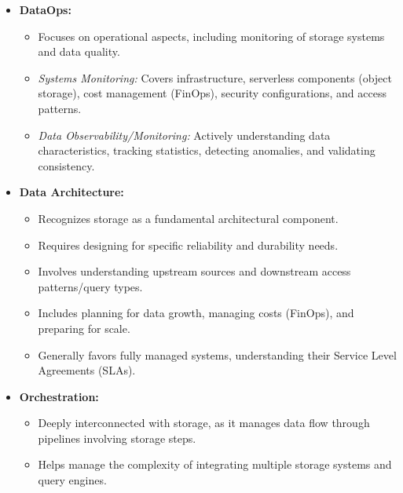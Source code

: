 \begin{itemize}
    \item \textbf{DataOps:}
    \begin{itemize}
        \item Focuses on operational aspects, including monitoring of
        storage systems and data quality.

        \item \textit{Systems Monitoring:} Covers infrastructure,
        serverless components (object storage), cost management
        (FinOps), security configurations, and access patterns.

        \item \textit{Data Observability/Monitoring:} Actively 
        understanding data characteristics, tracking statistics,
        detecting anomalies, and validating consistency.
    \end{itemize}

    \item \textbf{Data Architecture:}
    \begin{itemize}
        \item Recognizes storage as a fundamental architectural
        component.

        \item Requires designing for specific reliability and
        durability needs.

        \item Involves understanding upstream sources and
        downstream access patterns/query types.

        \item Includes planning for data growth, managing costs
        (FinOps), and preparing for scale.

        \item Generally favors fully managed systems, understanding
        their Service Level Agreements (SLAs).
    \end{itemize}

    \item \textbf{Orchestration:}
    \begin{itemize}
        \item Deeply interconnected with storage, as it manages
        data flow through pipelines involving storage steps.

        \item Helps manage the complexity of integrating multiple
        storage systems and query engines.
    \end{itemize}


\end{itemize}
